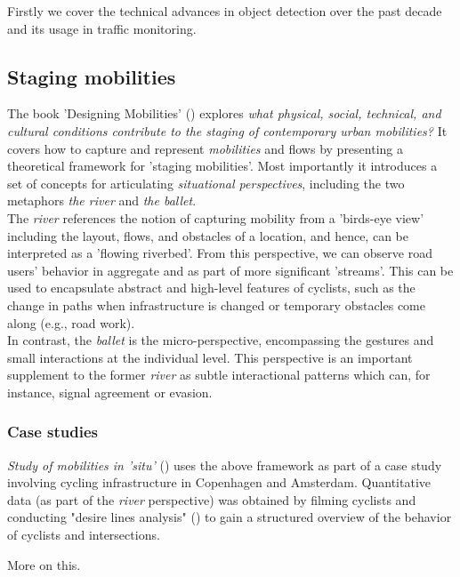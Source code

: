 \color{red}
Firstly we cover the technical advances in object detection over the past decade and its usage in traffic monitoring.
\color{black}

\subsection{Staging mobilities}
The book 'Designing Mobilities' (\cite{designinig_mobilities}) explores \textit{what physical, social, technical, and cultural conditions contribute to the staging of contemporary urban mobilities?} It covers how to capture and represent \textit{mobilities} and flows by presenting a theoretical framework for 'staging mobilities'. 
Most importantly it introduces a set of concepts for articulating \textit{situational perspectives},
 including the two metaphors \textit{the river} and \textit{the ballet}. 
 \ \\

 The \textit{river} references the notion of capturing mobility from a 'birds-eye view' including the layout, flows, and obstacles of a location, and hence, can be interpreted as a 'flowing riverbed'. From this perspective, we can observe road users' behavior in aggregate and as part of more significant 'streams'. This can be used to encapsulate abstract and high-level features of cyclists, such as the change in paths
 when infrastructure is changed or temporary obstacles come along (e.g., road work).
 \ \\

In contrast, the \textit{ballet} is the micro-perspective, encompassing the gestures and small interactions at the individual level.
This perspective is an important supplement to the former \textit{river} as subtle interactional patterns which can, for instance,
 signal agreement or evasion.

\subsubsection{Case studies}
\textit{Study of mobilities in 'situ'} (\cite{situ}) uses the above framework as part of a case study involving cycling infrastructure in 
Copenhagen and Amsterdam. Quantitative data (as part of the \textit{river} perspective) was obtained by filming cyclists and conducting 
"desire lines analysis" (\cite{cva}) to gain a structured overview of the behavior of cyclists and intersections. 

\color{red}
More on this.
\color{black}

